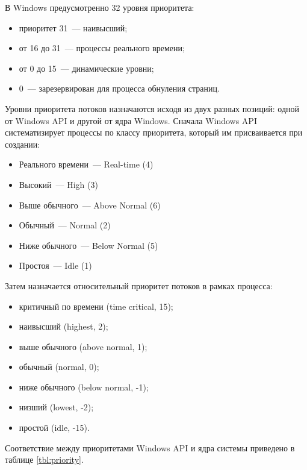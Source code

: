 \documentclass[14pt]{extarticle}
\begin{document}
В Windows предусмотренно 32 уровня приоритета:
\begin{itemize}
    \item приоритет 31~--- наивысший;
    \item от 16 до 31~--- процессы реального времени;
    \item от 0 до 15~--- динамические уровни;
    \item 0~--- зарезервирован для процесса обнуления страниц.	
\end{itemize}

Уровни приоритета потоков назначаются исходя из двух разных позиций: одной от
Windows API и другой от ядра Windows. Сначала Windows API систематизирует
процессы по классу приоритета, который им присваивается при создании:
\begin{itemize}
    \item Реального времени~--- Real-time (4)
    \item Высокий~--- High (3)
    \item Выше обычного~--- Above Normal (6)
    \item Обычный~--- Normal (2)
    \item Ниже обычного~--- Below Normal (5)
    \item Простоя~--- Idle (1)
\end{itemize}

Затем назначается относительный приоритет потоков в рамках процесса:
\begin{itemize}
    \item критичный по времени (time critical, 15);
    \item наивысший (highest, 2);
    \item выше обычного (above normal, 1);
    \item обычный (normal, 0);
    \item ниже обычного (below normal, -1);
    \item низший (lowest, -2);
    \item простой (idle, -15).
\end{itemize}

Соответствие между приоритетами Windows API и ядра системы приведено в таблице
\ref{tbl:priority}.
\end{document}
